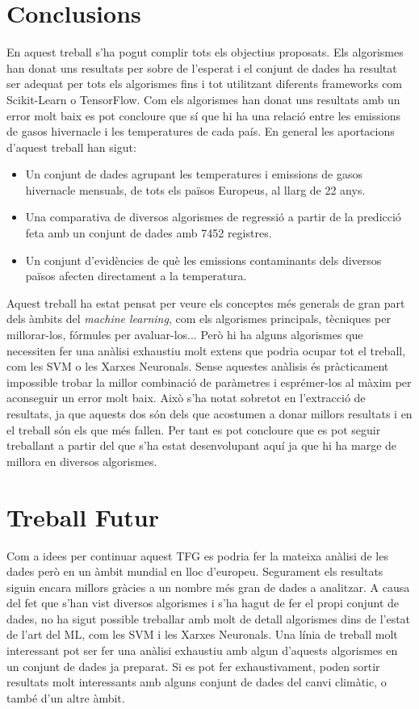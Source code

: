 \documentclass[10pt,a4paper,twocolumn,twoside]{article}
\begin{document}
\section {Conclusions}
En aquest treball s'ha pogut complir tots els objectius proposats. Els algorismes han donat uns resultats per sobre de l'esperat i el conjunt de dades ha resultat ser adequat per tots els algorismes fins i tot utilitzant diferents frameworks com Scikit-Learn o TensorFlow. Com els algorismes han donat uns resultats amb un error molt baix es pot concloure que sí que hi ha una relació entre les emissions de gasos hivernacle i les temperatures de cada país. En general les aportacions d'aquest treball han sigut:
\begin{itemize}
\item Un conjunt de dades agrupant les temperatures i emissions de gasos hivernacle mensuals, de tots els països Europeus, al llarg de 22 anys.
\item Una comparativa de diversos algorismes de regressió a partir de la predicció feta amb un conjunt de dades amb 7452 registres.
\item Un conjunt d'evidències de què les emissions contaminants dels diversos països afecten directament a la temperatura.
\end{itemize}
Aquest treball ha estat pensat per veure els conceptes més generals de gran part dels àmbits del \textit{machine learning}, com els algorismes principals, tècniques per millorar-los, fórmules per avaluar-los... Però hi ha alguns algorismes que necessiten fer una anàlisi exhaustiu molt extens que podria ocupar tot el treball, com les SVM o les Xarxes Neuronals. Sense aquestes anàlisis és pràcticament impossible trobar la millor combinació de paràmetres i esprémer-los al màxim per aconseguir un error molt baix. Això s'ha notat sobretot en l'extracció de resultats, ja que aquests dos són dels que acostumen a donar millors resultats i en el treball són els que més fallen. Per tant es pot concloure que es pot seguir treballant a partir del que s'ha estat desenvolupant aquí ja que hi ha marge de millora en diversos algorismes.

\section{Treball Futur}
Com a idees per continuar aquest TFG es podria fer la mateixa anàlisi de les dades però en un àmbit mundial en lloc d'europeu. Segurament els resultats siguin encara millors gràcies a un nombre més gran de dades a analitzar. A causa del fet que s'han vist diversos algorismes i s'ha hagut de fer el propi conjunt de dades, no ha sigut possible treballar amb molt de detall algorismes dins de l'estat de l'art del ML, com les SVM i les Xarxes Neuronals. Una línia de treball molt interessant pot ser fer una anàlisi exhaustiu amb algun d'aquests algorismes en un conjunt de dades ja preparat. Si es pot fer exhaustivament, poden sortir resultats molt interessants amb alguns conjunt de dades del canvi climàtic, o també d'un altre àmbit.
\end{document}
